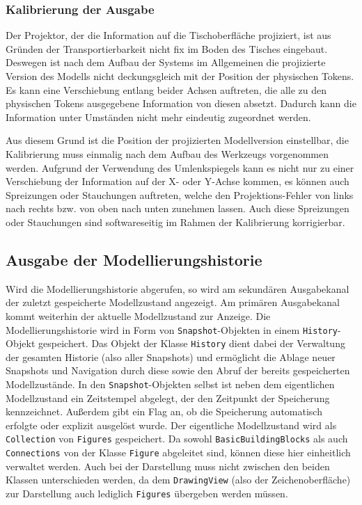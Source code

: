 \subsubsection{Kalibrierung der Ausgabe} %
\label{ssub:kalibrierung_der_ausgabe}

Der Projektor, der die Information auf die Tischoberfläche projiziert, ist aus Gründen der Transportierbarkeit nicht fix im Boden des Tisches eingebaut. Deswegen ist nach dem Aufbau der Systems im Allgemeinen die projizierte Version des Modells nicht deckungsgleich mit der Position der physischen Tokens. Es kann eine Verschiebung entlang beider Achsen auftreten, die alle zu den physischen Tokens ausgegebene Information von diesen absetzt. Dadurch kann die Information unter Umständen nicht mehr eindeutig zugeordnet werden.

Aus diesem Grund ist die Position der projizierten Modellversion einstellbar, die Kalibrierung muss einmalig nach dem Aufbau des Werkzeugs vorgenommen werden. Aufgrund der Verwendung des Umlenkspiegels kann es nicht nur zu einer Verschiebung der Information auf der X- oder Y-Achse kommen, es können auch Spreizungen oder Stauchungen auftreten, welche den Projektions-Fehler von links nach rechts bzw. von oben nach unten zunehmen lassen. Auch diese Spreizungen oder Stauchungen sind softwareseitig im Rahmen der Kalibrierung korrigierbar. 


\subsection{Ausgabe der Modellierungshistorie} %
\label{sub:ausgabe_der_modellierungshistorie}

Wird die Modellierungshistorie abgerufen, so wird am sekundären Ausgabekanal der zuletzt gespeicherte Modellzustand angezeigt. Am primären Ausgabekanal kommt weiterhin der aktuelle Modellzustand zur Anzeige. Die Modellierungshistorie wird in Form von \texttt{Snapshot}-Objekten in einem \texttt{History}-Objekt gespeichert. Das Objekt der Klasse \texttt{History} dient dabei der Verwaltung der gesamten Historie (also aller Snapshots) und ermöglicht die Ablage neuer Snapshots und Navigation durch diese sowie den Abruf der bereits gespeicherten Modellzustände. In den \texttt{Snapshot}-Objekten selbst ist neben dem eigentlichen Modellzustand ein Zeitstempel abgelegt, der den Zeitpunkt der Speicherung kennzeichnet. Außerdem gibt ein Flag an, ob die Speicherung automatisch erfolgte oder explizit ausgelöst wurde. Der eigentliche Modellzustand wird als \texttt{Collection} von \texttt{Figures} gespeichert. Da sowohl \texttt{BasicBuildingBlocks} als auch \texttt{Connections} von der Klasse \texttt{Figure} abgeleitet sind, können diese hier einheitlich verwaltet werden. Auch bei der Darstellung muss nicht zwischen den beiden Klassen unterschieden werden, da dem \texttt{DrawingView} (also der Zeichenoberfläche) zur Darstellung auch lediglich \texttt{Figures} übergeben werden müssen.

